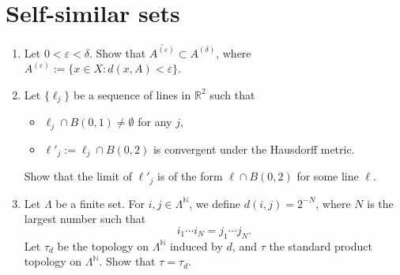 \section{Self-similar sets}
\begin{enumerate}
    \item Let $0 < \varepsilon < \delta$. Show that $\overline{A^{(\varepsilon)}} \subset A^{(\delta)}$, where $A^{(\varepsilon)} := \{x \in X : d(x,A) < \varepsilon\}$.

    \item Let $\{\ell_j\}$ be a sequence of lines in $\mathbb{R}^2$ such that
    \begin{itemize}
        \item[(i)] $\ell_j \cap B(0, 1) \neq \emptyset$ for any $j$,
        \item[and (ii)] $\ell'_j := \ell_j \cap B(0,2)$ is convergent under the Hausdorff metric.
    \end{itemize}
    Show that the limit of $\ell'_j$ is of the form $\ell \cap B(0,2)$ for some line $\ell$.

    \item Let $\Lambda$ be a finite set. For $i, j \in \Lambda^{\mathbb{N}}$, we define $d(i, j) = 2^{-N}$, where $N$ is the largest number such that
    \[
    i_1 \cdots i_N = j_1 \cdots j_N.
    \]
    Let $\tau_d$ be the topology on $\Lambda^{\mathbb{N}}$ induced by $d$, and $\tau$ the standard product topology on $\Lambda^{\mathbb{N}}$. Show that $\tau = \tau_d$.
\end{enumerate}